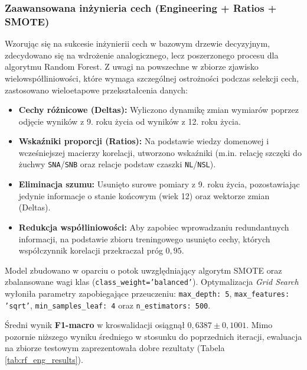 \documentclass[12pt, a4paper]{article}
\begin{document}
\subsubsection{Zaawansowana inżynieria cech (Engineering + Ratios + SMOTE)}

Wzorując się na sukcesie inżynierii cech w bazowym drzewie decyzyjnym, zdecydowano się na wdrożenie analogicznego, lecz poszerzonego procesu dla algorytmu Random Forest. Z uwagi na powszechne w zbiorze zjawisko wielowspółliniowości, które wymaga szczególnej ostrożności podczas selekcji cech, zastosowano wieloetapowe przekształcenia danych:
\begin{itemize}
    \item \textbf{Cechy różnicowe (Deltas):} Wyliczono dynamikę zmian wymiarów poprzez odjęcie wyników z 9. roku życia od wyników z 12. roku życia.
    \item \textbf{Wskaźniki proporcji (Ratios):} Na podstawie wiedzy domenowej i wcześniejszej macierzy korelacji, utworzono wskaźniki (m.in. relację szczęki do żuchwy \texttt{SNA}/\texttt{SNB} oraz relacje podstaw czaszki \texttt{NL}/\texttt{NSL}).
    \item \textbf{Eliminacja szumu:} Usunięto surowe pomiary z 9. roku życia, pozostawiając jedynie informacje o stanie końcowym (wiek 12) oraz wektorze zmian (Deltas).
    \item \textbf{Redukcja współliniowości:} Aby zapobiec wprowadzaniu redundantnych informacji, na podstawie zbioru treningowego usunięto cechy, których współczynnik korelacji przekraczał próg $0,95$.
\end{itemize}

Model zbudowano w oparciu o potok uwzględniający algorytm SMOTE oraz zbalansowane wagi klas (\texttt{class\_weight='balanced'}). Optymalizacja \textit{Grid Search} wyłoniła parametry zapobiegające przeuczeniu: \texttt{max\_depth: 5}, \texttt{max\_features: 'sqrt'}, \texttt{min\_samples\_leaf: 4} oraz \texttt{n\_estimators: 500}.

Średni wynik \textbf{F1-macro} w kroswalidacji osiągnął $0{,}6387 \pm 0{,}1001$. Mimo pozornie niższego wyniku średniego w stosunku do poprzednich iteracji, ewaluacja na zbiorze testowym zaprezentowała dobre rezultaty (Tabela \ref{tab:rf_eng_results}).
\end{document}
